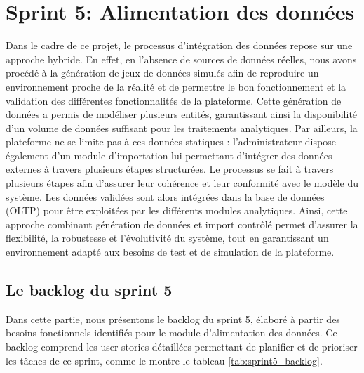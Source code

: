 \section{Sprint 5: Alimentation des données}
\label{sec:Sprint5:ETL}
Dans le cadre de ce projet, le processus d'intégration des données repose sur une approche hybride. En effet, en l'absence de sources de données réelles, nous avons procédé à la génération de jeux de données simulés afin de reproduire un environnement proche de la réalité et de permettre le bon fonctionnement et la validation des différentes fonctionnalités de la plateforme. Cette génération de données a permis de modéliser plusieurs entités, garantissant ainsi la disponibilité d'un volume de données suffisant pour les traitements analytiques.
Par ailleurs, la plateforme ne se limite pas à ces données statiques : l'administrateur dispose également d'un module d'importation lui permettant d'intégrer des données externes à travers plusieurs étapes structurées. Le processus se fait à travers plusieurs étapes afin d'assurer leur cohérence et leur conformité avec le modèle du système. Les données validées sont alors intégrées dans la base de données (OLTP) pour être exploitées par les différents modules analytiques.
Ainsi, cette approche combinant génération de données et import contrôlé permet d'assurer la flexibilité, la robustesse et l'évolutivité du système, tout en garantissant un environnement adapté aux besoins de test et de simulation de la plateforme.

\subsection{Le backlog du sprint 5}
Dans cette partie, nous présentons le backlog du sprint 5, élaboré à partir des besoins fonctionnels identifiés pour le module d'alimentation des données. Ce backlog comprend les user stories détaillées permettant de planifier et de prioriser les tâches de ce sprint, comme le montre le tableau \ref{tab:sprint5_backlog}.

